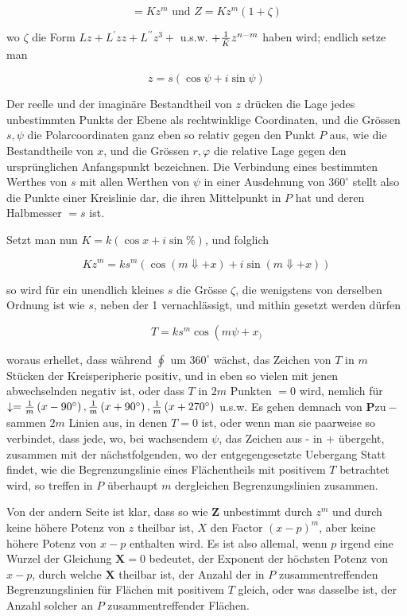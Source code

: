 \documentclass[twoside,12pt, showframe]{memoir}
\let\oldfrac\frac
\def\frac#1#2{\mathchoice{\tfrac{#1}{#2}}{\oldfrac{#1}{#2}}{\genfrac{}{}{}{2}{#1}{#2\mathstrut}}{\genfrac{}{}{}{3}{#1}{#2\mathstrut}}}
\begin{document}
\[
=K z^{m} \text { und } Z=K z^{m}(1+\zeta)
\]

wo \(\zeta\) die Form \(L z+L^{\prime} z z+L^{\prime \prime} z^{3}+\) u.s.w. \(+\frac{1}{\bar{K}} z^{n-m}\) haben wird; endlich setze man

\[
z=s(\cos \psi+i \sin \psi)
\]

Der reelle und der imaginäre Bestandtheil von \(z\) drücken die Lage jedes unbestimmten Punkts der Ebene als rechtwinklige Coordinaten, und die Grössen \(s, \psi\) die Polarcoordinaten ganz eben so relativ gegen den Punkt \(P\) aus, wie die Bestandtheile von \(x\), und die Grössen \(r, \varphi\) die relative Lage gegen den ursprünglichen Anfangspunkt bezeichnen. Die Verbindung eines bestimmten Werthes von \(s\) mit allen Werthen von \(\psi\) in einer Ausdehnung von \(360^{\circ}\) stellt also die Punkte einer Kreislinie dar, die ihren Mittelpunkt in \(P\) hat und deren Halbmesser \(=s\) ist.

Setzt man nun \(K=k(\cos x+i \sin \%)\), und folglich

\[
K z^{m}=k s^{m}(\cos (m \Downarrow+x)+i \sin (m \Downarrow+x))
\]

so wird für ein unendlich kleines \(s\) die Grösse \(\zeta\), die wenigstens von derselben Ordnung ist wie \(s\), neben der 1 vernachlässigt, und mithin gesetzt werden dürfen

\[
T=k s^{m} \cos \left(m \psi+x_{)}\right.
\]

woraus erhellet, dass während \(\oint\) um \(360^{\circ}\) wächst, das Zeichen von \(T\) in \(m\) Stücken der Kreisperipherie positiv, und in eben so vielen mit jenen abwechselnden negativ ist, oder dass \(T\) in \(2 m\) Punkten \(=0\) wird, nemlich für \(\downarrow=\frac{1}{m}\left(x-90^{\circ}\right), \frac{1}{m}\left(x+90^{\circ}\right), \frac{1}{m}\left(x+270^{\circ}\right)\) u.s.w. Es gehen demnach von \(\boldsymbol{P} \mathrm{zu}-\)
sammen \(2 m\) Linien aus, in denen \(T=0\) ist, oder wenn man sie paarweise so verbindet, dass jede, wo, bei wachsendem \(\psi\), das Zeichen aus - in + übergeht, zusammen mit der nächstfolgenden, wo der entgegengesetzte Uebergang Statt findet, wie die Begrenzungslinie eines Flächentheils mit positivem \(T\) betrachtet wird, so treffen in \(P\) überhaupt \(m\) dergleichen Begrenzungslinien zusammen.

Von der andern Seite ist klar, dass so wie \(\boldsymbol{Z}\) unbestimmt durch \(z^{m}\) und durch keine höhere Potenz von \(z\) theilbar ist, \(X\) den Factor \((x-p)^{m}\), aber keine höhere Potenz von \(x-p\) enthalten wird. Es ist also allemal, wenn \(p\) irgend eine Wurzel der Gleichung \(\boldsymbol{X}=0\) bedeutet, der Exponent der höchsten Potenz von \(x-p\), durch welche \(\mathbf{X}\) theilbar ist, der Anzahl der in \(P\) zusammentreffenden Begrenzungslinien für Flächen mit positivem \(T\) gleich, oder was dasselbe ist, der Anzahl solcher an \(P\) zusammentreffender Flächen.
\end{document}
